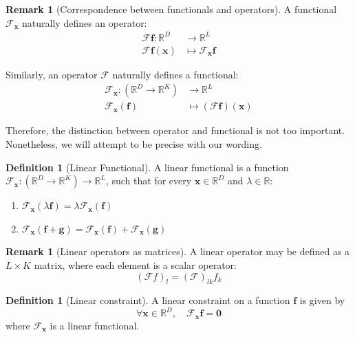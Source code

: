 \documentclass[12pt,a4paper,twoside]{report}
\theoremstyle{definition}
\newtheorem{remark}[thm]{Remark}
\newtheorem{definition}[thm]{Definition}
\newcommand{\f}{\mathscr F_\mathbf x}
\begin{document}
\begin{remark}[Correspondence between functionals and operators]\label{remark}
	A functional $\f$ naturally defines an operator:
	\begin{align*}
		\mathscr F \mathbf f:\mathbb{R}^D&\to\mathbb{R}^L\\
		\mathscr F \mathbf f(\mathbf x)&\mapsto\f \mathbf f
	\end{align*}

	Similarly, an operator $\mathscr F$ naturally defines a functional:
	\begin{align*}
		\mathscr F_\mathbf x:(\mathbb{R}^D\to\mathbb{R}^K)&\to \mathbb{R}^L\\
		\mathscr F_\mathbf x(\mathbf f)&\mapsto (\mathscr F \mathbf f)(\mathbf x)
	\end{align*}

	Therefore, the distinction between operator and functional is not too important. Nonetheless, we will attempt to be precise with our wording.
\end{remark}

\begin{definition}[Linear Functional]\label{linearfunctional}
	 A linear functional is a function $\mathscr F_\mathbf x: (\mathbb{R}^D\to\mathbb{R}^K)\to\mathbb{R}^L$, such that for every $\mathbf x\in \mathbb{R}^D$ and $\lambda \in \mathbb{R}$:
	\begin{enumerate}
		\item $\mathscr{F}_{\mathbf x}(\lambda \mathbf f) = \lambda \mathscr{F}_\mathbf x (\mathbf f)$
		\item $\mathscr{F}_\mathbf x(\mathbf f + \mathbf g) = \mathscr{F}_\mathbf x(\mathbf f) + \mathscr{F}_\mathbf x(\mathbf g)$
	\end{enumerate}
\end{definition}

\begin{remark}[Linear operators as matrices]\label{matrix}
	A linear operator may be defined as a $L\times K$ matrix, where each element is a scalar operator:
	$$(\mathscr F f)_{l} = (\mathscr F)_{lk} f_k$$
\end{remark}


\begin{definition}[Linear constraint]
	A linear constraint on a function $\mathbf f$ is given by $$\forall \mathbf x\in \mathbb{R}^D,\quad \mathscr F_\mathbf x \mathbf f =\mathbf 0$$ where $\mathscr F_\mathbf x$ is a linear functional.
\end{definition}
\end{document}
